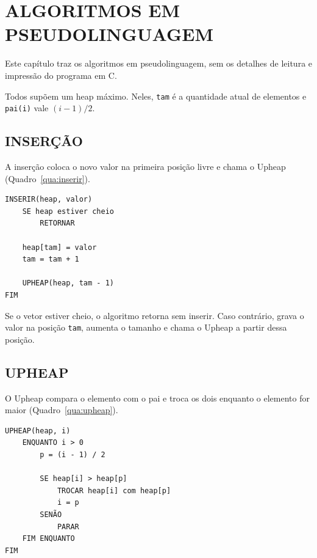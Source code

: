 \documentclass[12pt,openany,oneside,a4paper,english,brazil,sumario=tradicional]{abntex2}
\begin{document}
\chapter{ALGORITMOS EM PSEUDOLINGUAGEM}

Este capítulo traz os algoritmos em pseudolinguagem, sem os detalhes de leitura e impressão do programa em C.

Todos supõem um heap máximo. Neles, \texttt{tam} é a quantidade atual de elementos e \texttt{pai(i)} vale $(i - 1) / 2$.

\section{INSERÇÃO}

A inserção coloca o novo valor na primeira posição livre e chama o Upheap (Quadro~\ref{qua:inserir}).

\begin{quadro}[htb]
\caption{\label{qua:inserir}Pseudocódigo da inserção}
\begin{Verbatim}
INSERIR(heap, valor)
    SE heap estiver cheio
        RETORNAR

    heap[tam] = valor
    tam = tam + 1

    UPHEAP(heap, tam - 1)
FIM
\end{Verbatim}
\end{quadro}

Se o vetor estiver cheio, o algoritmo retorna sem inserir. Caso contrário, grava o valor na posição \texttt{tam}, aumenta o tamanho e chama o Upheap a partir dessa posição.

\section{UPHEAP}

O Upheap compara o elemento com o pai e troca os dois enquanto o elemento for maior (Quadro~\ref{qua:upheap}).

\begin{quadro}[htb]
\caption{\label{qua:upheap}Pseudocódigo do Upheap}
\begin{Verbatim}
UPHEAP(heap, i)
    ENQUANTO i > 0
        p = (i - 1) / 2

        SE heap[i] > heap[p]
            TROCAR heap[i] com heap[p]
            i = p
        SENÃO
            PARAR
    FIM ENQUANTO
FIM
\end{Verbatim}
\end{quadro}
\end{document}
